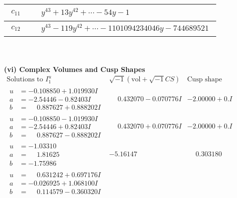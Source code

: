 \documentclass[1p]{elsarticle_modified}
\theoremstyle{definition}
\newcommand{\I}{\sqrt{-1}}
\begin{document}
\begin{tabular}{m{50pt}|m{274pt}}
\hline $$\begin{aligned}c_{11}\end{aligned}$$&$\begin{aligned}
&y^{43}+13 y^{42}+\cdots-54 y-1
\end{aligned}$\\
\hline $$\begin{aligned}c_{12}\end{aligned}$$&$\begin{aligned}
&y^{43}-119 y^{42}+\cdots-1101094234046 y-744689521
\end{aligned}$\\
\hline
\end{tabular}\\~\\
\newpage\flushleft \textbf{(vi) Complex Volumes and Cusp Shapes}
$$\begin{array}{c|c|c}  
\text{Solutions to }I^u_{1}& \I (\text{vol} + \sqrt{-1}CS) & \text{Cusp shape}\\
 \hline 
\begin{aligned}
u &= -0.108850 + 1.019930 I \\
a &= -2.54446 - 0.82403 I \\
b &= \phantom{-}0.887627 + 0.888202 I\end{aligned}
 & \phantom{-}0.432070 - 0.070776 I & -2.00000 + 0. I\phantom{ +0.000000I} \\ \hline\begin{aligned}
u &= -0.108850 - 1.019930 I \\
a &= -2.54446 + 0.82403 I \\
b &= \phantom{-}0.887627 - 0.888202 I\end{aligned}
 & \phantom{-}0.432070 + 0.070776 I & -2.00000 + 0. I\phantom{ +0.000000I} \\ \hline\begin{aligned}
u &= -1.03310\phantom{ +0.000000I} \\
a &= \phantom{-}1.81625\phantom{ +0.000000I} \\
b &= -1.75986\phantom{ +0.000000I}\end{aligned}
 & -5.16147\phantom{ +0.000000I} & \phantom{-}0.303180\phantom{ +0.000000I} \\ \hline\begin{aligned}
u &= \phantom{-}0.631242 + 0.697176 I \\
a &= -0.026925 + 1.068100 I \\
b &= \phantom{-}0.114579 - 0.360320 I\end{aligned}

\end{array}$$
\end{document}
